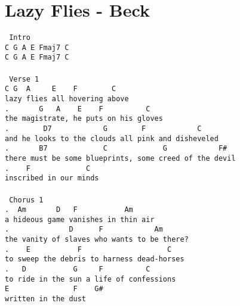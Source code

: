 \newpage
\section{Lazy Flies - Beck}
\label{Lazy Flies - Beck}
\texttt{\lbrack\ Intro\rbrack\\
C\ G\ A\ E\ Fmaj7\ C\\
C\ G\ A\ E\ Fmaj7\ C\\
\\
\lbrack\ Verse\ 1\rbrack\\
C\ G\ \ A\ \ \ \ \ E\ \ \ \ F\ \ \ \ \ \ \ \ C\\
lazy\ flies\ all\ hovering\ above\\
. \ \ \ \ \ \ G\ \ \ A\ \ \ \ E\ \ \ \ F\ \ \ \ \ \ \ \ \ \ C\\
the\ magistrate,\ he\ puts\ on\ his\ gloves\\
. \ \ \ \ \ \ \ D7\ \ \ \ \ \ \ \ \ \ \ \ G\ \ \ \ \ \ \ \ F\ \ \ \ \ \ \ \ \ \ \ \ C\\
and\ he\ looks\ to\ the\ clouds\ all\ pink\ and\ disheveled\\
. \ \ \ \ \ \ B7\ \ \ \ \ \ \ \ \ \ \ \ \ C\ \ \ \ \ \ \ \ \ \ \ \ \ G\ \ \ \ \ \ \ \ \ \ \ \ F\#\ \\
there\ must\ be\ some\ blueprints,\ some\ creed\ of\ the\ devil\\
. \ \ \ F\ \ \ \ \ \ \ \ \ \ \ \ \ C\\
inscribed\ in\ our\ minds\\
\\
\lbrack\ Chorus\ 1\rbrack\\
. \ Am\ \ \ \ \ \ \ D\ \ \ F\ \ \ \ \ \ \ \ \ \ \ Am\ \ \\
a\ hideous\ game\ vanishes\ in\ thin\ air\\
. \ \ \ \ \ \ \ \ \ \ \ \ \ D\ \ \ \ \ \ F\ \ \ \ \ \ \ \ \ \ \ \ Am\ \ \\
the\ vanity\ of\ slaves\ who\ wants\ to\ be\ there?\\
. \ \ \ E\ \ \ \ \ \ \ \ \ \ \ F\ \ \ \ \ \ \ \ \ \ \ \ \ \ \ \ \ \ \ \ C\\
to\ sweep\ the\ debris\ to\ harness\ dead-horses\\
. \ \ D\ \ \ \ \ \ \ \ \ \ \ G\ \ \ \ \ F\ \ \ \ \ \ \ \ \ \ C\\
to\ ride\ in\ the\ sun\ a\ life\ of\ confessions\\
E\ \ \ \ \ \ \ \ \ \ \ \ \ \ \ F\ \ \ \ G\#\ \ \\
written\ in\ the\ dust\\
\\
}
